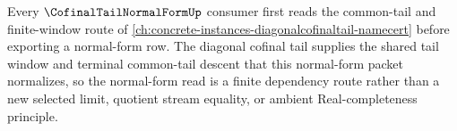\begin{lemma}
\label{lem:cofinal-tail-normal-form-diagonal-dependency}
Every $\CofinalTailNormalFormUp$ consumer first reads the common-tail and finite-window route of \autoref{ch:concrete-instances-diagonalcofinaltail-namecert} before exporting a normal-form row. The diagonal cofinal tail supplies the shared tail window and terminal common-tail descent that this normal-form packet normalizes, so the normal-form read is a finite dependency route rather than a new selected limit, quotient stream equality, or ambient Real-completeness principle.
\end{lemma}
